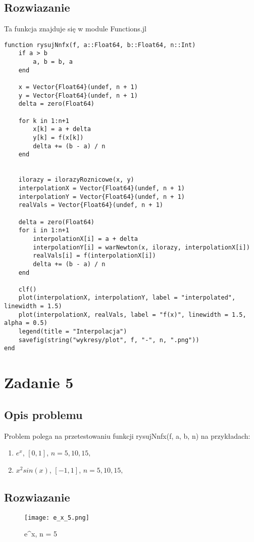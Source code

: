 \documentclass{article}
\begin{document}
\subsection{Rozwiazanie}
Ta funkcja znajduje się w module Functions.jl
\begin{verbatim}
function rysujNnfx(f, a::Float64, b::Float64, n::Int)
    if a > b
        a, b = b, a
    end

    x = Vector{Float64}(undef, n + 1)
    y = Vector{Float64}(undef, n + 1)
    delta = zero(Float64)

    for k in 1:n+1
        x[k] = a + delta
        y[k] = f(x[k])
        delta += (b - a) / n
    end


    ilorazy = ilorazyRoznicowe(x, y)
    interpolationX = Vector{Float64}(undef, n + 1)
    interpolationY = Vector{Float64}(undef, n + 1)
    realVals = Vector{Float64}(undef, n + 1)

    delta = zero(Float64)
    for i in 1:n+1
        interpolationX[i] = a + delta
        interpolationY[i] = warNewton(x, ilorazy, interpolationX[i])
        realVals[i] = f(interpolationX[i])
        delta += (b - a) / n
    end

    clf()
    plot(interpolationX, interpolationY, label = "interpolated", linewidth = 1.5)
    plot(interpolationX, realVals, label = "f(x)", linewidth = 1.5, alpha = 0.5)
    legend(title = "Interpolacja")
    savefig(string("wykresy/plot", f, "-", n, ".png"))
end
\end{verbatim}

\section{Zadanie 5}
\subsection{Opis problemu}
Problem polega na przetestowaniu funkcji rysujNnfx(f, a, b, n) na przykładach:
\begin{enumerate}
    \item $e^x$, $[0,1]$, $n = 5,10,15,$
    \item $x^2sin(x)$, $[-1,1]$, $n = 5,10,15,$
\end{enumerate}
\subsection{Rozwiazanie}
\begin{figure}[H] 
\centering
\texttt{[image: e\_x\_5.png]}
\caption{e^x, n = 5}
\label{e_x_5}
\end{figure}
\end{document}

